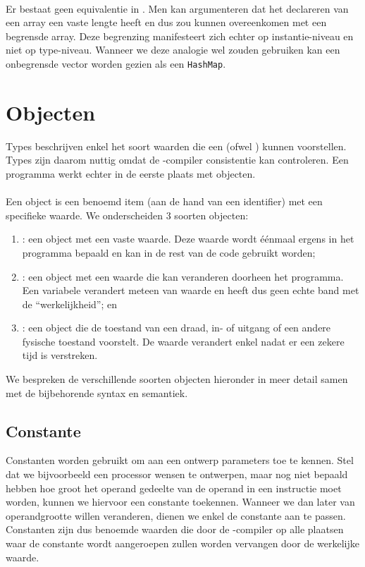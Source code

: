
\paragraph{}
Er bestaat geen equivalentie in \tjava{}. Men kan argumenteren dat het declareren van een array een vaste lengte heeft en dus zou kunnen overeenkomen met een begrensde array. Deze begrenzing manifesteert zich echter op instantie-niveau en niet op type-niveau. Wanneer we deze analogie wel zouden gebruiken kan een onbegrensde vector worden gezien als een \texttt{HashMap}.

\section{Objecten}
Types beschrijven enkel het soort waarden die een  (ofwel ) kunnen voorstellen. Types zijn daarom nuttig omdat de \tvhdl{}-compiler consistentie kan controleren. Een programma werkt echter in de eerste plaats met objecten.
\paragraph{}
Een object is een benoemd item (aan de hand van een identifier) met een specifieke waarde. We onderscheiden 3 soorten objecten:
\begin{enumerate}
 \item {}: een object met een vaste waarde. Deze waarde wordt \'e\'enmaal ergens in het programma bepaald en kan in de rest van de code gebruikt worden;
 \item {}: een object met een waarde die kan veranderen doorheen het programma. Een variabele verandert meteen van waarde en heeft dus geen echte band met de ``werkelijkheid''; en
 \item {}: een object die de toestand van een draad, in- of uitgang of een andere fysische toestand voorstelt. De waarde verandert enkel nadat er een zekere tijd is verstreken.
\end{enumerate}

We bespreken de verschillende soorten objecten hieronder in meer detail samen met de bijbehorende syntax en semantiek.

\subsection{Constante}
Constanten worden gebruikt om aan een ontwerp parameters toe te kennen. Stel dat we bijvoorbeeld een processor wensen te ontwerpen, maar nog niet bepaald hebben hoe groot het operand gedeelte van de operand in een instructie moet worden, kunnen we hiervoor een constante toekennen. Wanneer we dan later van operandgrootte willen veranderen, dienen we enkel de constante aan te passen. Constanten zijn dus benoemde waarden die door de \tvhdl{}-compiler op alle plaatsen waar de constante wordt aangeroepen zullen worden vervangen door de werkelijke waarde.

